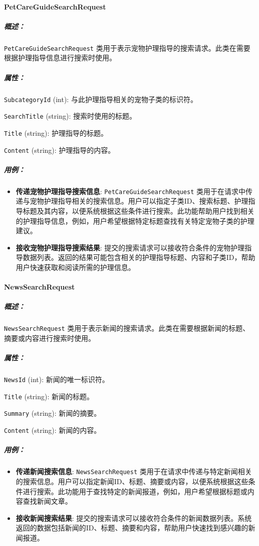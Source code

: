 \paragraph{PetCareGuideSearchRequest}
\subparagraph{概述：} \texttt{PetCareGuideSearchRequest} 类用于表示宠物护理指导的搜索请求。此类在需要根据护理指导信息进行搜索时使用。

\subparagraph{属性：}

\texttt{SubcategoryId} (int): 与此护理指导相关的宠物子类的标识符。

\texttt{SearchTitle} (string): 搜索时使用的标题。

\texttt{Title} (string): 护理指导的标题。

\texttt{Content} (string): 护理指导的内容。


\subparagraph{用例：}
\begin{itemize}
	\item \textbf{传递宠物护理指导搜索信息}: \texttt{PetCareGuideSearchRequest} 类用于在请求中传递与宠物护理指导相关的搜索信息。用户可以指定子类ID、搜索标题、护理指导标题及其内容，以便系统根据这些条件进行搜索。此功能帮助用户找到相关的护理指导信息，例如，用户希望根据特定标题查找有关特定宠物子类的护理建议。
	\item \textbf{接收宠物护理指导搜索结果}: 提交的搜索请求可以接收符合条件的宠物护理指导数据列表。返回的结果可能包含相关的护理指导标题、内容和子类ID，帮助用户快速获取和阅读所需的护理信息。
\end{itemize}

\paragraph{NewsSearchRequest}
\subparagraph{概述：} \texttt{NewsSearchRequest} 类用于表示新闻的搜索请求。此类在需要根据新闻的标题、摘要或内容进行搜索时使用。

\subparagraph{属性：}

\texttt{NewsId} (int): 新闻的唯一标识符。

\texttt{Title} (string): 新闻的标题。

\texttt{Summary} (string): 新闻的摘要。

\texttt{Content} (string): 新闻的内容。


\subparagraph{用例：}
\begin{itemize}
	\item \textbf{传递新闻搜索信息}: \texttt{NewsSearchRequest} 类用于在请求中传递与特定新闻相关的搜索信息。用户可以指定新闻ID、标题、摘要或内容，以便系统根据这些条件进行搜索。此功能用于查找特定的新闻报道，例如，用户希望根据标题或内容查找新闻文章。
	\item \textbf{接收新闻搜索结果}: 提交的搜索请求可以接收符合条件的新闻数据列表。系统返回的数据包括新闻的ID、标题、摘要和内容，帮助用户快速找到感兴趣的新闻报道。
\end{itemize}

